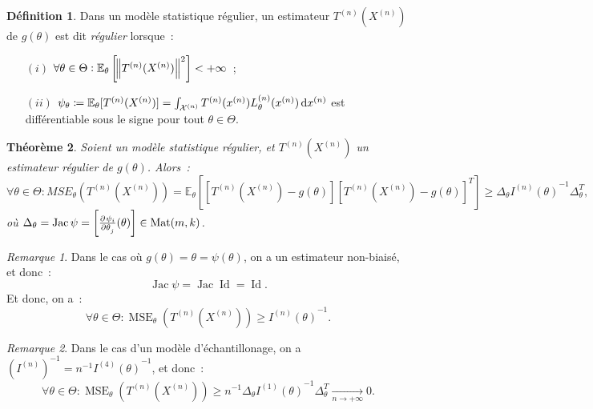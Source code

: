 \documentclass{report}
\DeclareMathOperator{\Mat}{Mat}
\DeclareMathOperator{\MSE}{MSE}
\DeclareMathOperator{\Jac}{Jac}  %
\DeclareMathOperator{\Id}{Id}
\newcommand{\E}{\mathbb E}
\newcommand{\pinfty}{{+\infty}}
\newcommand{\n}{{(n)}}
\newcommand{\Xn}{{X^\n}}
\newcommand{\Tn}{{T^\n}}
\newcommand{\TnXn}{{\Tn(\Xn)}}
\newtheorem{thm}{Théorème}[chapter]
\theoremstyle{definition}
\newtheorem{déf}[thm]{Définition}
\theoremstyle{remark}
\newtheorem*{rmq}{Remarque}
\begin{document}
			\begin{déf} Dans un modèle statistique régulier, un estimateur $\TnXn$ de $g(\theta)$ est dit \textit{régulier} lorsque~:
			\begin{itemize}
				\item[$(i)$]  $\forall \theta \in \Theta : \E_\theta\left[\norm {\TnXn}^2\right] < \pinfty$~;
				\item[$(ii)$] $\psi_\theta \coloneqq \E_\theta[\TnXn] = \int_{\mathcal X^{(n)}}\Tn(x^{(n)})L_\theta^{(n)}(x^{(n)})\dif x^{(n)}$
				est différentiable sous le signe pour tout $\theta \in \Theta$.
			\end{itemize}
			\end{déf}

			\begin{thm}\label{thm:borneinfMSE} Soient un modèle statistique régulier, et $\TnXn$ un estimateur régulier de $g(\theta)$. Alors~:
			\[\forall \theta \in \Theta : MSE_\theta(\TnXn) = \E_\theta\left[\left[\TnXn - g(\theta)\right]\left[\TnXn - g(\theta)\right]^T\right]
				\geq \Delta_\theta{I^{(n)}(\theta)}^{-1}\Delta_\theta^T,\]
			où $\Delta_\theta = \Jac \psi = \left[\pd {\psi_i}{\theta_j}(\theta)\right] \in \Mat(m, k)$.
			\end{thm}

			\begin{rmq} Dans le cas où $g(\theta) = \theta = \psi(\theta)$, on a un estimateur non-biaisé, et donc~:
			\[\Jac \psi = \Jac \Id = \Id.\]
			Et donc, on a~:
			\[\forall \theta \in \Theta : \MSE_\theta(\TnXn) \geq {I^{(n)}(\theta)}^{-1}.\]
			\end{rmq}

			\begin{rmq} Dans le cas d'un modèle d'échantillonage, on a $(I^{(n)})^{-1} = n^{-1}{I^{(4)}(\theta)}^{-1}$, et donc~:
			\[\forall \theta \in \Theta : \MSE_\theta(\TnXn) \geq n^{-1}\Delta_\theta{I^{(1)}(\theta)}^{-1}\Delta_\theta^T \xrightarrow[n \to \pinfty]{} 0.\]
			\end{rmq}
\end{document}
